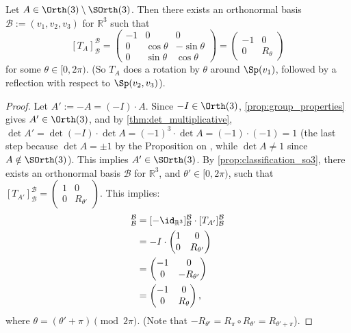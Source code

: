 \begin{proposition}
\label{prop:classification_o3_minus_so3}
Let $A \in \Orth(3) \setminus \SOrth(3)$. Then there exists an orthonormal basis $\mathcal{B} := (v_1, v_2, v_3)$ for $\mathbb{R}^3$ such that 
\[ [T_A]_{\mathcal{B}}^{\mathcal{B}} = \begin{pmatrix} -1 & 0 & 0 \\ 0 & \cos\theta & -\sin\theta \\ 0 & \sin\theta & \cos\theta \end{pmatrix} = \begin{pmatrix} -1 & 0 \\ 0 & R_\theta \end{pmatrix} \]
for some $\theta \in [0, 2\pi)$. (So $T_A$ does a rotation by $\theta$ around $\Sp(v_1)$, followed by a reflection with respect to $\Sp(v_2, v_3)$).
\end{proposition}

\begin{proof}
Let $A' := -A = (-I) \cdot A$. Since $-I \in \Orth(3)$, \cref{prop:group_properties} gives $A' \in \Orth(3)$, and by \cref{thm:det_multiplicative}, $\det A' = \det(-I) \cdot \det A = (-1)^3 \cdot \det A = (-1) \cdot (-1) = 1$ (the last step because $\det A = \pm 1$ by the Proposition on , while $\det A \neq 1$ since $A \notin \SOrth(3)$).
This implies $A' \in \SOrth(3)$. By \cref{prop:classification_so3}, there exists an orthonormal basis $\mathcal{B}$ for $\mathbb{R}^3$, and $\theta' \in [0, 2\pi)$, such that $[T_{A'}]_{\mathcal{B}}^{\mathcal{B}} = \left(\begin{smallmatrix} 1 & 0 \\ 0 & R_{\theta'} \end{smallmatrix}\right)$. 
This implies:
\begin{align*}
    [T_A]_{\mathcal{B}}^{\mathcal{B}} &= [-\id_{\mathbb{R}^3}]_{\mathcal{B}}^{\mathcal{B}} \cdot [T_{A'}]_{\mathcal{B}}^{\mathcal{B}} \\
    &= -I \cdot \begin{pmatrix} 1 & 0 \\ 0 & R_{\theta'} \end{pmatrix} \\
    &= \begin{pmatrix} -1 & 0 \\ 0 & -R_{\theta'} \end{pmatrix} \\
    &= \begin{pmatrix} -1 & 0 \\ 0 & R_\theta \end{pmatrix},
\end{align*}
where $\theta = (\theta' + \pi) \pmod{2\pi}$. 
(Note that $-R_{\theta'} = R_\pi \circ R_{\theta'} = R_{\theta' + \pi}$).
\end{proof}


